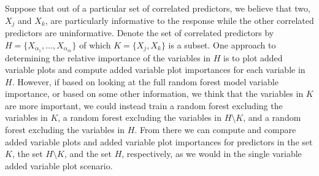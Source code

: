 \documentclass[12pt,twoside]{reedthesis}
\theoremstyle{definition}
\theoremstyle{definition}
\theoremstyle{definition}
\theoremstyle{remark}
\begin{document}
Suppose that out of a particular set of correlated predictors, we
believe that two, \(X_j\) and \(X_k\), are particularly informative to
the response while the other correlated predictors are uninformative.
Denote the set of correlated predictors by
\(H=\{X_{\alpha_1},\ldots,X_{\alpha_m}\}\) of which \(K=\{X_j,X_k\}\) is
a subset. One approach to determining the relative importance of the
variables in \(H\) is to plot added variable plots and compute added
variable plot importances for each variable in \(H\). However, if based
on looking at the full random forest model variable importance, or based
on some other information, we think that the variables in \(K\) are more
important, we could instead train a random forest excluding the
variables in \(K\), a random forest excluding the variables in
\(H\setminus K\), and a random forest excluding the variables in \(H\).
From there we can compute and compare added variable plots and added
variable plot importances for predictors in the set \(K\), the set
\(H\setminus K\), and the set \(H\), respectively, as we would in the
single variable added variable plot scenario. \par
\end{document}
